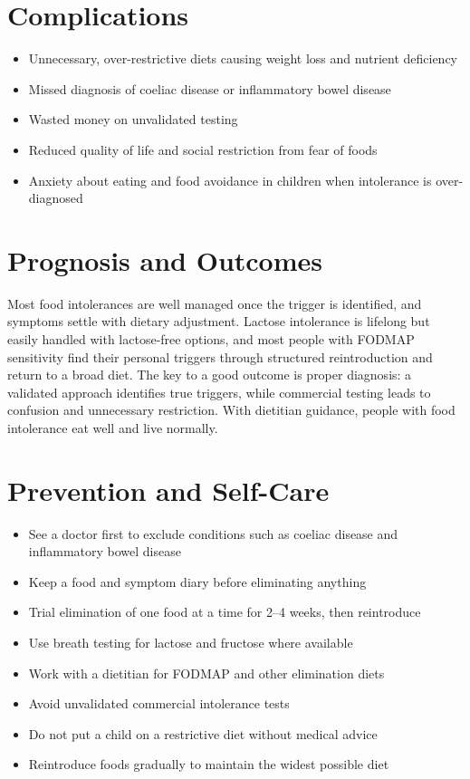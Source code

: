 \section*{Complications}
\begin{itemize}
    \item Unnecessary, over-restrictive diets causing weight loss and nutrient deficiency
    \item Missed diagnosis of coeliac disease or inflammatory bowel disease
    \item Wasted money on unvalidated testing
    \item Reduced quality of life and social restriction from fear of foods
    \item Anxiety about eating and food avoidance in children when intolerance is over-diagnosed
\end{itemize}

\section*{Prognosis and Outcomes}
Most food intolerances are well managed once the trigger is identified, and symptoms settle with dietary adjustment. Lactose intolerance is lifelong but easily handled with lactose-free options, and most people with FODMAP sensitivity find their personal triggers through structured reintroduction and return to a broad diet. The key to a good outcome is proper diagnosis: a validated approach identifies true triggers, while commercial testing leads to confusion and unnecessary restriction. With dietitian guidance, people with food intolerance eat well and live normally.

\section*{Prevention and Self-Care}
\begin{itemize}
    \item See a doctor first to exclude conditions such as coeliac disease and inflammatory bowel disease
    \item Keep a food and symptom diary before eliminating anything
    \item Trial elimination of one food at a time for 2--4 weeks, then reintroduce
    \item Use breath testing for lactose and fructose where available
    \item Work with a dietitian for FODMAP and other elimination diets
    \item Avoid unvalidated commercial intolerance tests
    \item Do not put a child on a restrictive diet without medical advice
    \item Reintroduce foods gradually to maintain the widest possible diet
\end{itemize}

